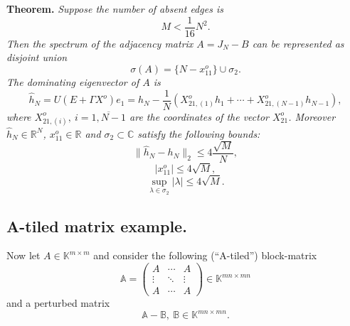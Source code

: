 \documentclass[a4paper]{jpconf}
\begin{document}
\textbf{Theorem.}
{\it
    Suppose the number of absent edges is
    \[ M < \frac{1}{16} N^2. \]
    Then the spectrum of the adjacency matrix \( A = J_N - B \)
        can be represented as disjoint union
    \[
        \sigma(A) = \{ N - x_{11}^o \} \cup \sigma_2.
    \]
    The dominating eigenvector of \( A \) is
    \[
        \hat{h}_N = U(E+\Gamma X^o) e_1 =
            h_N - \frac1N (X_{21,(1)}^o h_1 + \cdots + X_{21, (N{-}1)}^o h_{N{-}1}),
    \]
    where \( X_{21,(i)}^o,\ i=\overline{1,N{-}1} \) are the coordinates
    of the vector \( X_{21}^o \).
    Moreover \( \hat{h}_N\in\mathbb{R}^{N} \),
    \( x_{11}^o\in\mathbb{R} \) and \( \sigma_2\subset\mathbb{C} \)
    satisfy the following bounds:
    \[
        \|\hat{h}_N - h_N\|_2 \leq 4\frac{\sqrt{M}}{N},
    \]
    \[
        \lvert x_{11}^o \rvert \leq 4\sqrt{M},
    \]
    \[
        \sup_{\lambda\in\sigma_2} \lvert\lambda\rvert \leq 4\sqrt{M}.
    \]
}

\subsection*{A-tiled matrix example.}

Now let \( A\in\mathbb{K}^{m{\times}m} \)
    and consider the following (``A-tiled'') block-matrix
    \[
        \mathbb{A} =
        \begin{pmatrix}
            A & \cdots & A \\
            \vdots & \ddots & \vdots \\
            A & \cdots & A
        \end{pmatrix}
        \in\mathbb{K}^{{mn}{\times}{mn}}
    \]
    and a perturbed matrix
    \[
        \mathbb{A} - \mathbb{B},\ \mathbb{B}\in\mathbb{K}^{{mn}{\times}{mn}}.
    \]
\end{document}
